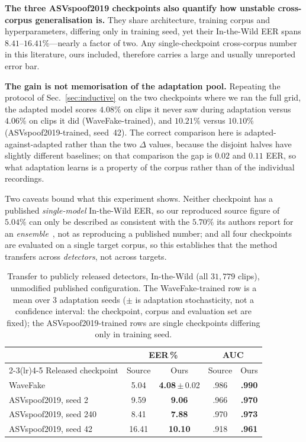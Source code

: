 \documentclass[conference]{IEEEtran}
\begin{document}
\textbf{The three ASVspoof2019 checkpoints also quantify how unstable
cross-corpus generalisation is.} They share architecture, training corpus and
hyperparameters, differing only in training seed, yet their In-the-Wild EER
spans $8.41$--$16.41\%$---nearly a factor of two. Any single-checkpoint
cross-corpus number in this literature, ours included, therefore carries a large
and usually unreported error bar.

\textbf{The gain is not memorisation of the adaptation pool.} Repeating the
protocol of Sec.~\ref{sec:inductive} on the two checkpoints where we ran the full
grid, the adapted model scores $4.08\%$ on clips it never saw during adaptation
versus $4.06\%$ on clips it did (WaveFake-trained), and $10.21\%$ versus
$10.10\%$ (ASVspoof2019-trained, seed~42). The correct comparison here is
adapted-against-adapted rather than the two $\Delta$ values, because the disjoint
halves have slightly different baselines; on that comparison the gap is $0.02$
and $0.11$ EER, so what adaptation learns is a property of the corpus rather than
of the individual recordings.

Two caveats bound what this experiment shows. Neither checkpoint has a published
\emph{single-model} In-the-Wild EER, so our reproduced source figure of $5.04\%$
can only be described as consistent with the $5.70\%$ its authors report for an
\emph{ensemble}~\cite{shiftyspeech}, not as reproducing a published number; and
all four checkpoints are evaluated on a single target corpus, so this establishes
that the method transfers across \emph{detectors}, not across targets.

\begin{table}[t]
\centering
\caption{Transfer to publicly released detectors, In-the-Wild (all $31{,}779$
clips), unmodified published configuration. The WaveFake-trained row is a mean
over 3 adaptation seeds ($\pm$ is adaptation stochasticity, not a confidence
interval: the checkpoint, corpus and evaluation set are fixed); the
ASVspoof2019-trained rows are single checkpoints differing only in training seed.}
\label{tab:publicckpt}
\begin{tabular}{@{}lcccc@{}}
\toprule
& \multicolumn{2}{c}{EER\,\%} & \multicolumn{2}{c}{AUC} \\
\cmidrule(lr){2-3}\cmidrule(lr){4-5}
Released checkpoint & Source & Ours & Source & Ours \\
\midrule
WaveFake~\cite{shiftyspeech}        & 5.04  & \textbf{4.08}\,$\pm$\,0.02 & .986 & \textbf{.990} \\
ASVspoof2019, seed 2~\cite{deepfensehf}   & 9.59  & \textbf{9.06}  & .966 & \textbf{.970} \\
ASVspoof2019, seed 240~\cite{deepfensehf} & 8.41  & \textbf{7.88}  & .970 & \textbf{.973} \\
ASVspoof2019, seed 42~\cite{deepfensehf}  & 16.41 & \textbf{10.10} & .918 & \textbf{.961} \\
\bottomrule
\end{tabular}
\end{table}
\end{document}
